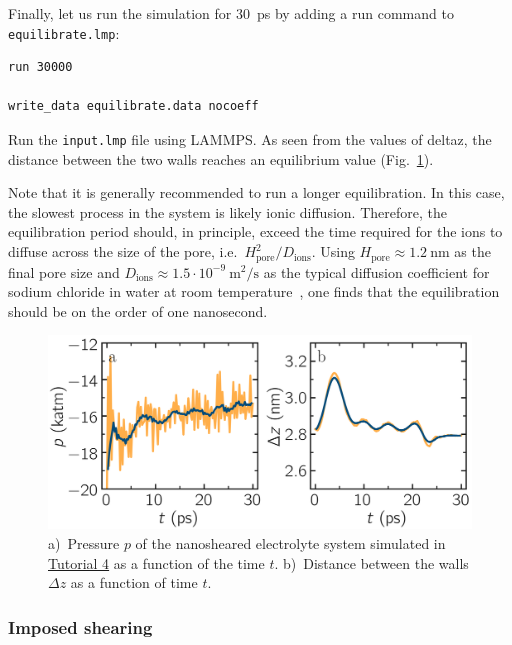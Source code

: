 \documentclass[9pt,tutorial]{livecoms}
\newcommand{\lmpcmd}[1]{\hspace{0pt}\colorbox{listing}{\textcolor{command}{\small{#1}}}\hspace{0pt}} %
\newcommand{\flecmd}[1]{\textcolor{command}{\texttt{#1}}} %
\begin{document}
Finally, let us run the simulation for 30~ps by adding a \lmpcmd{run} command
to \flecmd{equilibrate.lmp}:
\begin{lstlisting}
run 30000

write_data equilibrate.data nocoeff
\end{lstlisting}
Run the \flecmd{input.lmp} file using LAMMPS.  As seen from the values of
\lmpcmd{deltaz}, the distance between the two walls reaches
an equilibrium value (Fig.~\ref{fig:NANOSHEAR-equilibration}).

\begin{note}
Note that it is generally recommended to run a longer equilibration.  In this case,
the slowest process in the system is likely ionic diffusion.
Therefore, the equilibration period should, in principle, exceed the time required
for the ions to diffuse across the size of the pore, i.e.~$H_\text{pore}^2/D_\text{ions}$.
Using $H_\text{pore} \approx 1.2~\text{nm}$ as the final pore size
and $D_\text{ions} \approx 1.5 \cdot 10^{-9}~\text{m}^2/\text{s}$
as the typical diffusion coefficient for sodium chloride in water at room
temperature~\cite{mills1955remeasurement}, one finds that the equilibration
should be on the order of one nanosecond.
\end{note}

\begin{figure}
\centering
\includegraphics[width=\linewidth]{NANOSHEAR-equilibration}
\caption{a)~Pressure $p$ of the nanosheared electrolyte system
simulated in \hyperref[sheared-confined-label]{Tutorial 4} as a function of the
time $t$.  b)~Distance between the walls $\Delta z$ as a function of time $t$.}
\label{fig:NANOSHEAR-equilibration}
\end{figure}

\subsubsection{Imposed shearing}
\end{document}
